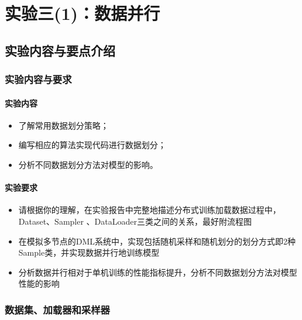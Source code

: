 \chapter{实验三(1)：数据并行}

\section{实验内容与要点介绍}

\subsection{实验内容与要求}

\subsubsection{实验内容}
\begin{itemize}
    \item 了解常用数据划分策略；
    \item 编写相应的算法实现代码进行数据划分；
    \item 分析不同数据划分方法对模型的影响。
\end{itemize}


\subsubsection{实验要求}
\begin{itemize}
    \item 请根据你的理解，在实验报告中完整地描述分布式训练加载数据过程中，Dataset、Sampler 、DataLoader三类之间的关系，最好附流程图
    \item 在模拟多节点的DML系统中，实现包括随机采样和随机划分的划分方式即2种Sample类，并实现数据并行地训练模型
    \item 分析数据并行相对于单机训练的性能指标提升，分析不同数据划分方法对模型性能的影响
\end{itemize}


\subsection{数据集、加载器和采样器}

